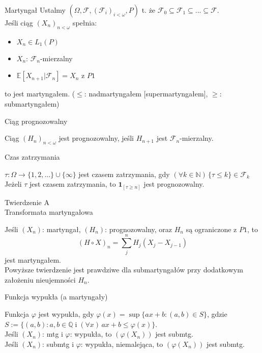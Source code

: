 \documentclass[avery5371,grid,frame]{flashcards}
\begin{document}

\begin{flashcard}[Definicja]{Martyngał}
\smallskip
Ustalmy $ \left( \Omega, \mathcal{F}, \left( \mathcal{F}_i \right) _{i < \omega}, P \right) $ t. że $\mathcal{F}_0 \subseteq \mathcal{F}_1 \subseteq ... \subseteq \mathcal{F}$. \\
Jeśli ciąg $\left( X_n \right) _{n < \omega} $ spełnia:
\begin{itemize}
\item $ X_n \in L_1(P) $
\item $ X_n $: $ \mathcal{F}_n $-mierzalny
\item $ \mathbb{E} [ X_{n+1} | \mathcal{F}_n ] = X_n $ z $P1$
\end{itemize}
to jest martyngałem. ($ \leq $: nadmartyngałem [supermartyngałem], $ \geq $: submartyngałem)
\end{flashcard}

\begin{flashcard}[Definicja]{Ciąg prognozowalny}

\smallskip
Ciąg $ \left( H_n \right) _{n < \omega} $ jest prognozowalny, jeśli $H_{n+1}$ jest $\mathcal{F}_n$-mierzalny.
\end{flashcard}

\begin{flashcard}[Definicja]{Czas zatrzymania}

\smallskip
$\tau: \Omega \rightarrow \{1, 2, ...\} \cup \{ \infty \}$ jest czasem zatrzymania, gdy $(\forall k \in \mathbb{N}) \, \{ \tau \leq k \} \in \mathcal{F}_k$ \\
Jeżeli $\tau$ jest czasem zatrzymania, to $\mathbf{1}_{[\tau \geq n]}$ jest prognozowalny.
\end{flashcard}

\begin{flashcard}[Twierdzenie]{Twierdzenie A \\ Transformata martyngałowa}

\smallskip
Jeśli $(X_n)$: martyngał, $(H_n)$: prognozowalny, oraz $H_n$ są ograniczone z $P1$, to
$$ (H \circ X)_n = \sum ^n _j H_j (X_j - X_{j-1})  $$
jest martyngałem. \\
Powyższe twierdzenie jest prawdziwe dla submartyngałów przy dodatkowym założeniu nieujemności $H_n$.
\end{flashcard}

\begin{flashcard}[Definicja]{Funkcja wypukła (a martyngały)}

\smallskip
Funkcja $\varphi$ jest wypukła, gdy $\varphi(x) = \sup \{ ax+b : (a, b) \in S\}$, gdzie $S := \{(a, b) : a, b \in \mathbb{Q} \; \text{i} \; (\forall x) \, ax+b \leq \varphi(x) \}$. \\
Jeśli $(X_n)$: mtg i $\varphi$: wypukła, to $(\varphi(X_n))$ jest submtg. \\
Jeśli $(X_n)$: submtg i $\varphi$: wypukła, niemalejąca, to $(\varphi(X_n))$ jest submtg.
\end{flashcard}
\end{document}
